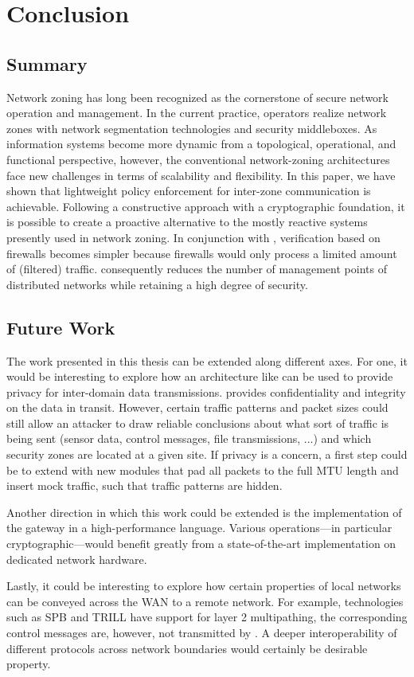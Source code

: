 \chapter{Conclusion}
\label{concl}

\section{Summary}
\label{ssummary}

Network zoning has long been recognized as the cornerstone of secure network operation and management.
In the current practice, operators realize network zones with network segmentation technologies and security middleboxes.
As information systems become more dynamic from a topological, operational, and functional perspective, however, the conventional network-zoning architectures face new challenges in terms of scalability and flexibility.
In this paper, we have shown that lightweight policy enforcement for inter-zone communication
is achievable.
Following a constructive approach with a cryptographic foundation, it is possible to create a proactive alternative to the mostly reactive systems presently used in network zoning.
In conjunction with \name, verification based on firewalls becomes simpler because firewalls would only process a limited amount of (filtered) traffic.
\name consequently reduces the number of management points of distributed networks while retaining a high degree of security.

\section{Future Work}
\label{sfuture}

The work presented in this thesis can be extended along different axes. For
one, it would be interesting to explore how an architecture like \name can be
used to provide privacy for inter-domain data transmissions. \name provides
confidentiality and integrity on the data in transit. However, certain traffic
patterns and packet sizes could still allow an attacker to draw reliable conclusions about
what sort of traffic is being sent (\eg sensor data, control messages, file
transmissions, ...) and which security zones are located
at a given site. If privacy is a concern, a first step could be to extend \tps
with new modules that pad all packets to the full MTU length and insert mock
traffic, such that traffic patterns are hidden.

Another direction in which this work could be extended is the implementation
of the \tp gateway in a high-performance language. Various operations---in
particular cryptographic---would benefit greatly from a state-of-the-art
implementation on dedicated network hardware.

Lastly, it could be interesting to explore how certain properties of local
networks can be conveyed across the WAN to a remote network. For example, technologies such as
SPB and TRILL have support for layer 2 multipathing, the corresponding control
messages are, however, not transmitted by \name. A deeper interoperability of
different protocols across network boundaries would certainly be desirable property.

